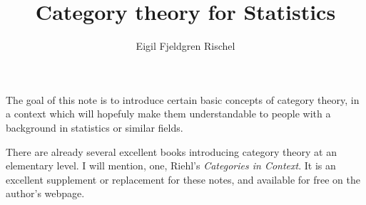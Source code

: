 \documentclass{article}
\title{Category theory for Statistics}
\author{Eigil Fjeldgren Rischel}
\date{}
\begin{document}
\maketitle

The goal of this note is to introduce certain basic concepts of category theory, in a context which will hopefuly make them understandable to people with a background in statistics or similar fields.

There are already several excellent books introducing category theory at an elementary level. I will mention, one, Riehl's \emph{Categories in Context}.
It is an excellent supplement or replacement for these notes, and available for free on the author's webpage.
\end{document}
